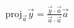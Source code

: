 \documentclass[preview]{standalone}
\begin{document}
\begin{align*}
\text{proj}_{\vec{a}} \vec{y} = \frac{\vec{y} \cdot \vec{a}}{\vec{a} \cdot \vec{a}} \vec{a}
\end{align*}
\end{document}
